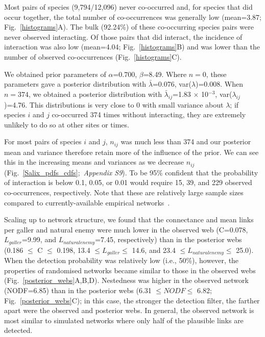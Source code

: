 \documentclass[12pt]{article}
\begin{document}
\begin{spacing}{2.0}
  Most pairs of species (9,794/12,096) never co-occurred and, for species that did occur together, the total number of co-occurrences was generally low (mean=3.87; Fig.~\ref{histograms}A). The bulk (92.24\%) of these co-occurring species pairs were never observed interacting. Of those pairs that did interact, the incidence of interaction was also low (mean=4.04; Fig.~\ref{histograms}B) and was lower than the number of observed co-occurrences (Fig.~\ref{histograms}C).


  We obtained prior parameters of $\alpha$=0.700, $\beta$=8.49. Where $n = 0$, these parameters gave a posterior distribution with $\bar\lambda$=0.076, var($\lambda$)=0.008. When $n = 374$, we obtained a posterior distribution with $\bar\lambda_{ij}$=1.83 $\times$ 10$^{-3}$, var($\lambda_{ij}$)=4.76. This distributions is very close to 0 with small variance about $\lambda$; if species $i$ and $j$ co-occurred 374 times without interacting, they   are extremely unlikely to do so at other sites or times. 


  For most pairs of species $i$ and $j$, $n_{ij}$ was much less than 374 and our posterior mean and variance therefore retain more of the influence of the prior. We can see this in the increasing means and variances as we decrease $n_{ij}$ (Fig.~\ref{Salix_pdfs_cdfs};~\emph{Appendix S9}). To be 95\% confident that the probability of interaction is below 0.1, 0.05, or 0.01 would require 15, 39, and 229 observed co-occurrences, respectively. Note that these are relatively large sample sizes compared to currently-available empirical networks~\citep{Morris2014}.


  Scaling up to network structure, we found that the connectance and mean links per galler and natural enemy were much lower in the observed web (C=0.078, $L_{galler}$=9.99, and $L_{natural enemy}$=7.45, respectively) than in the posterior webs (0.186 $\leq$ C $\leq$ 0.198, 13.4 $\leq L_{galler} \leq$ 14.6, and 23.4 $\leq L_{natural enemy} \leq$ 25.0). When the detection probability was relatively low (i.e., 50\%), however, the properties of randomised networks became similar to those in the observed webs (Fig.~\ref{posterior_webs}A,B,D). Nestedness was higher in the observed network (NODF=6.85) than in the posterior webs (6.31 $\leq NODF \leq$ 6.82; Fig.~\ref{posterior_webs}C); in this case, the stronger the detection filter, the farther apart were the observed and posterior webs. In general, the observed network is most similar to simulated networks where only half of the plausible links are detected. 



\end{spacing}
\end{document}
